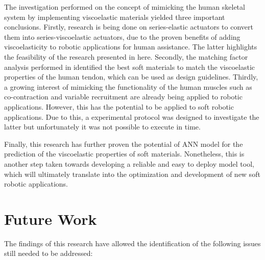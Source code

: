 The investigation performed on the concept of mimicking the human skeletal system by implementing viscoelastic materials yielded three important conclusions. Firstly, research is being done on series-elastic actuators to convert them into series-viscoelastic actuators, due to the proven benefits of adding viscoelasticity to robotic applications for human assistance. The latter highlights the feasibility of the research presented in here. Secondly, the matching factor analysis performed in  identified the best soft materials to match the viscoelastic properties of the human tendon, which can be used as design guidelines. Thirdly, a growing interest of mimicking the functionality of the human muscles such as co-contraction and variable recruitment are already being applied to robotic applications. However, this has the potential to be applied to soft robotic applications. Due to this, a experimental protocol was designed to investigate the latter but unfortunately it was not possible to execute in time.

Finally, this research has further proven the potential of ANN model for the prediction of the viscoelastic properties of soft materials. Nonetheless, this is another step taken towards developing a reliable and easy to deploy model tool, which will ultimately translate into the optimization and development of new soft robotic applications.

\section{Future Work}

The findings of this research have allowed the identification of the following issues still needed to be addressed:

